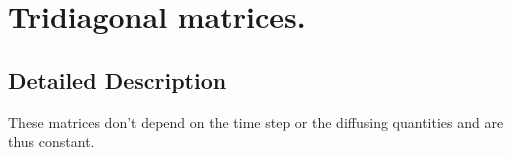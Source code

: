 \hypertarget{group__matrices}{\section{Tridiagonal matrices.}
\label{group__matrices}
}


\subsection{Detailed Description}
These matrices don't depend on the time step or the diffusing quantities and are thus constant. 
